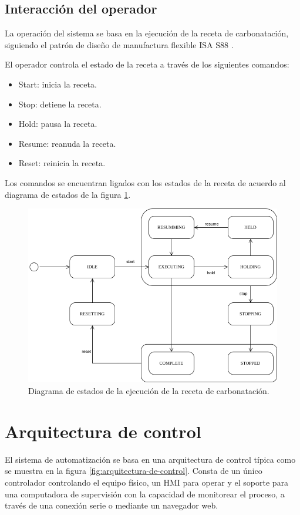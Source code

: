 \subsection{Interacción del operador}
La operación del sistema se basa en la ejecución de la receta de carbonatación, siguiendo el patrón de diseño de manufactura flexible ISA S88 \cite{BRAN}.

El operador controla el estado de la receta a través de los siguientes comandos:

\begin{itemize}
\item Start: inicia la receta.
\item Stop: detiene la receta.
\item Hold: pausa la receta.
\item Resume: reanuda la receta.
\item Reset: reinicia la receta.
\end{itemize}

Los comandos se encuentran ligados con los estados de la receta de acuerdo al diagrama de estados de la figura \ref{fig:estados-de-la-receta}.

\begin{figure}[H]
  \centering
  \includegraphics[width=\linewidth]{introduccion-general/img/recipe-state-diagram.png}
  \caption{Diagrama de estados de la ejecución de la receta de carbonatación.}
  \label{fig:estados-de-la-receta}
\end{figure}


\section{Arquitectura de control}
El sistema de automatización se basa en una arquitectura de control típica como se muestra en la figura \ref{fig:arquitectura-de-control}. Consta de un único controlador controlando el equipo físico, un HMI para operar y el soporte para una computadora de supervisión con la capacidad de monitorear el proceso, a través de una conexión serie o mediante un navegador web.

